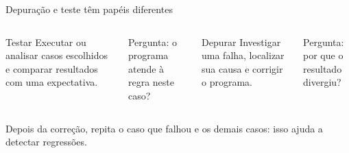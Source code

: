 \begin{frame}{Depuração e teste têm papéis diferentes}
\begin{columns}[T]
\begin{block}{Testar}
Executar ou analisar casos escolhidos e comparar resultados com uma expectativa.
\end{block}
\small Pergunta: o programa atende à regra neste caso?
\begin{block}{Depurar}
Investigar uma falha, localizar sua causa e corrigir o programa.
\end{block}
\small Pergunta: por que o resultado divergiu?
\end{columns}
\vspace{0.5cm}
Depois da correção, repita o caso que falhou e os demais casos: isso ajuda a detectar regressões.
\end{frame}

